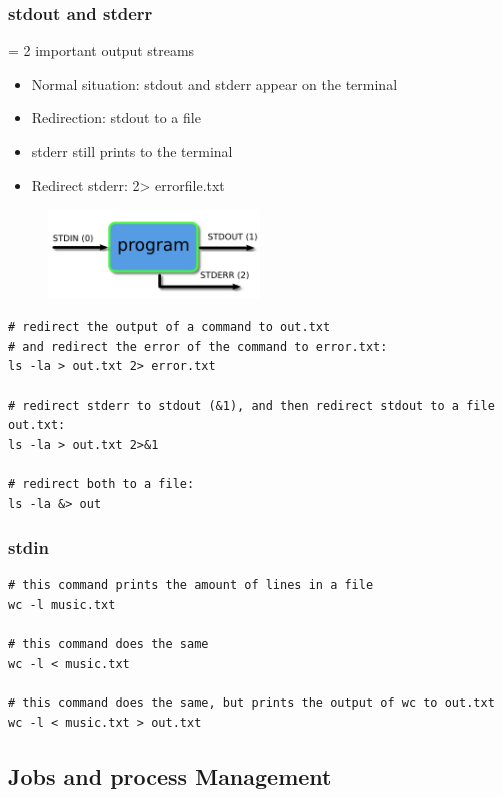\documentclass{article}
\begin{document}
\subsubsection{stdout and stderr}

= 2 important output streams

\begin{itemize}
    \item Normal situation: stdout and stderr appear on the terminal
    \item Redirection: stdout to a file
    \item stderr still prints to the terminal
    \item Redirect stderr: 2> errorfile.txt
\end{itemize}

\begin{figure}[H]
    \centering
    \includegraphics[width=0.5\textwidth]{redirection-std.png}
    \caption{}
\end{figure}

\begin{verbatim}
# redirect the output of a command to out.txt 
# and redirect the error of the command to error.txt:
ls -la > out.txt 2> error.txt

# redirect stderr to stdout (&1), and then redirect stdout to a file out.txt:
ls -la > out.txt 2>&1

# redirect both to a file:
ls -la &> out
\end{verbatim}

\subsubsection{stdin}

\begin{verbatim}
# this command prints the amount of lines in a file
wc -l music.txt

# this command does the same
wc -l < music.txt

# this command does the same, but prints the output of wc to out.txt
wc -l < music.txt > out.txt
\end{verbatim}

\subsection{Jobs and process Management}
\end{document}
